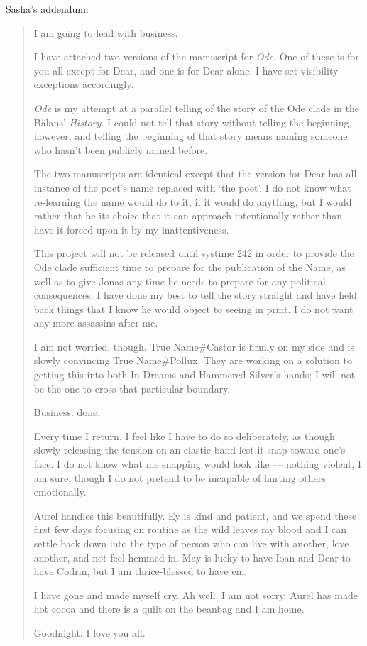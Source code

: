 Sasha's addendum:

\begin{quote}
I am going to lead with business.

I have attached two versions of the manuscript for \emph{Ode}. One of these is for you all except for Dear, and one is for Dear alone. I have set visibility exceptions accordingly.

\emph{Ode} is my attempt at a parallel telling of the story of the Ode clade in the Bălans' \emph{History}. I could not tell that story without telling the beginning, however, and telling the beginning of that story means naming someone who hasn't been publicly named before.

The two manuscripts are identical except that the version for Dear has all instance of the poet's name replaced with `the poet'. I do not know what re-learning the name would do to it, if it would do anything, but I would rather that be its choice that it can approach intentionally rather than have it forced upon it by my inattentiveness.

This project will not be released until systime 242 in order to provide the Ode clade sufficient time to prepare for the publication of the Name, as well as to give Jonas any time he needs to prepare for any political consequences. I have done my best to tell the story straight and have held back things that I know he would object to seeing in print. I do not want any more assassins after me.

I am not worried, though. True Name\#Castor is firmly on my side and is slowly convincing True Name\#Pollux. They are working on a solution to getting this into both In Dreams and Hammered Silver's hands; I will not be the one to cross that particular boundary.

Business: done.

Every time I return, I feel like I have to do so deliberately, as though slowly releasing the tension on an elastic band lest it snap toward one's face. I do not know what me snapping would look like — nothing violent, I am sure, though I do not pretend to be incapable of hurting others emotionally.

Aurel handles this beautifully. Ey is kind and patient, and we spend these first few days focusing on routine as the wild leaves my blood and I can settle back down into the type of person who can live with another, love another, and not feel hemmed in. May is lucky to have Ioan and Dear to have Codrin, but I am thrice-blessed to have em.

I have gone and made myself cry. Ah well. I am not sorry. Aurel has made hot cocoa and there is a quilt on the beanbag and I am home.

Goodnight. I love you all.
\end{quote}

